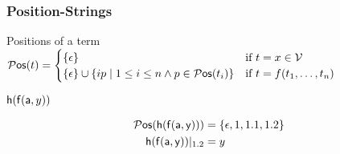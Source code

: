 
\begin{frame}
\frametitle{Position-Strings}
\begin{exampleblock}{Positions of a term}
$
	{}{\mathcal P}\mathsf{os}(t) =  
	\begin{cases}
		\{ \epsilon \} & \text{if }t=x\in{\mathcal V} \\
		\{ \epsilon \} \cup \{ ip\mid 1\leq i\leq n \land p\in{}{\mathcal P}\mathsf{os}(t_i)\} &
		\text{if }t=f(t_1,\ldots,t_n)
	\end{cases}
$
\end{exampleblock}

\begin{exampleblock}{${\mathsf h}({\mathsf f}({\mathsf a},y))$}
\begin{minipage}[c]{3cm}
\end{minipage}
\begin{minipage}[b]{8cm}
\begin{align*}
{}{\mathcal P}\mathsf{os}({\mathsf h}({\mathsf f}({\mathsf a},{\mathsf y}))) &= \{ \epsilon, 1, 1.1, 1.2 \}
\\
{\mathsf h}({\mathsf f}({\mathsf a},{\mathsf y}))|_{1.2} &= y
\end{align*}
%
\end{minipage}
\end{exampleblock}
\end{frame}
